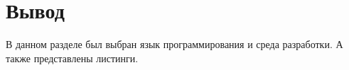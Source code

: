 





\section{Вывод}

В данном разделе был выбран язык программирования и среда разработки.
А также представлены листинги.